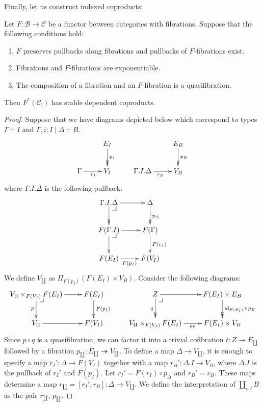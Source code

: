 \documentclass[reqno]{amsart}
\makeatletter
\theoremstyle{definition}
\theoremstyle{remark}
\newcommand{\fs}[1]{\mathrm{#1}}
\newcommand{\scat}[1]{\mathcal{#1}}
\newcommand{\id}{\fs{id}}
\numberwithin{figure}{section}
\newcommand{\pb}[1][dr]{\save*!/#1-1.2pc/#1:(-1,1)@^{|-}\restore}
\makeatother
\begin{document}
Finally, let us construct indexed coproducts:

\begin{prop}[coproducts]
Let $F : \scat{B} \to \scat{C}$ be a functor between categories with fibrations.
Suppose that the following conditions hold:
\begin{enumerate}
\item $F$ preserves pullbacks along fibrations and pullbacks of $F$-fibrations exist.
\item Fibrations and $F$-fibrations are exponentiable.
\item The composition of a fibration and an $F$-fibration is a quasifibration.
\end{enumerate}
Then $F^*(\scat{C}_!)$ has stable dependent coproducts.
\end{prop}
\begin{proof}
Suppose that we have diagrams depicted below which correspond to types $\Gamma \vdash I$ and $\Gamma, i : I \mid \Delta \vdash B$.
\[ \xymatrix{                       & E_I \ar@{->>}[d]^{p_I} \\
              \Gamma \ar[r]_{r_I}   & V_I
            } \qquad
   \xymatrix{                               & E_B \ar@{->>}[d]^{p_B} \\
              \Gamma.I.\Delta \ar[r]_{r_B}  & V_B
            } \]
where $\Gamma.I.\Delta$ is the following pullback:
\[ \xymatrix{ \Gamma.I.\Delta \ar[r] \ar@{->>}[d] \pb   & \Delta \ar@{->>}[d]^{p_\Delta} \\
              F(\Gamma.I) \ar[r] \ar[d] \pb             & F(\Gamma) \ar[d]^{F(r_I)} \\
              F(E_I) \ar[r]_{F(p_I)}                    & F(V_I)
            } \]
We define $V_\amalg$ as $\Pi_{F(p_I)}(F(E_I) \times V_B)$.
Consider the following diagrams:
\[ \xymatrix{ V_\amalg \times_{F(V_I)} F(E_I) \ar[r] \ar[d]_p \pb   & F(E_I) \ar[d]^{F(p_I)} \\
              V_\amalg \ar[r]                                       & F(V_I)
            } \qquad
   \xymatrix{ Z \ar[r] \ar@{->>}[d]_q \pb                       & F(E_I) \times E_B \ar@{->>}[d]^{\id_{F(E_I)} \times p_B} \\
              V_\amalg \times_{F(V_I)} F(E_I) \ar[r]_-{\fs{ev}} & F(E_I) \times V_B
            } \]
Since $p \circ q$ is a quasifibration, we can factor it into a trivial cofibration $t : Z \to E_\amalg$ followed by a fibration $p_\amalg : E_\amalg \twoheadrightarrow V_\amalg$.
To define a map $\Delta \to V_\amalg$, it is enough to specify a map $r_I' : \Delta \to F(V_I)$ together with a map $r_B' : \Delta.I \to V_B$, where $\Delta.I$ is the pullback of $r_I'$ and $F(p_I)$.
Let $r_I' = F(r_I) \circ p_\Delta$ and $r_B' = r_B$.
These maps determine a map $r_\amalg = [r_I',r_B] : \Delta \to V_\amalg$.
We define the interpretation of $\coprod_{i : I} B$ as the pair $r_\amalg$, $p_\amalg$.


\end{proof}
\end{document}
